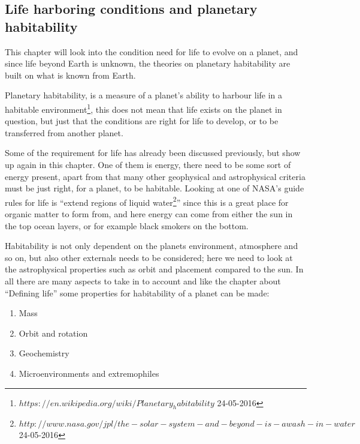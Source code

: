 \subsection{Life harboring conditions and planetary habitability}
This chapter will look into the condition need for life to evolve on a planet, and since life beyond Earth is unknown, the theories on planetary habitability are built on what is known from Earth.\par
Planetary habitability, is a measure of a planet’s ability to harbour life in a habitable environment\footnote{$https://en.wikipedia.org/wiki/Planetary_habitability$ 24-05-2016}, this does not mean that life exists on the planet in question, but just that the conditions are right for life to develop, or to be transferred from another planet.\par 
Some of the requirement for life has already been discussed previously, but show up again in this chapter. One of them is energy, there need to be some sort of energy present, apart from that many other geophysical and astrophysical criteria must be just right, for a planet, to be habitable. Looking at one of NASA’s guide rules for life is “extend regions of liquid water\footnote{$http://www.nasa.gov/jpl/the-solar-system-and-beyond-is-awash-in-water$ 24-05-2016}”  since this is a great place for organic matter to form from, and here energy can come from either the sun in the top ocean layers, or for example black smokers on the bottom.\par
Habitability is not only dependent on the planets environment, atmosphere and so on, but also other externals needs to be considered; here we need to look at the astrophysical properties such as orbit and placement compared to the sun. In all there are many aspects to take in to account and like the chapter about “Defining life” some properties for habitability of a planet can be made:\par

\begin{enumerate}
\item Mass

\item Orbit and rotation

\item Geochemistry

\item Microenvironments and extremophiles

\end{enumerate} \par

